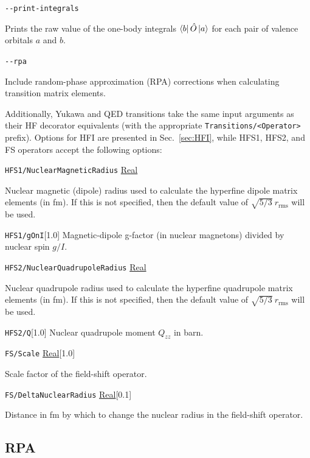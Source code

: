 \documentclass{report}
\begin{document}
\texttt{{-}{-}print-integrals} 
\begin{adjustwidth}{1cm}{}
Prints the raw value of the one-body integrals $\bra{b}\hat{O}\ket{a}$ for each pair of valence 
orbitals $a$ and $b$.
\end{adjustwidth}

\texttt{{-}{-}rpa}
\begin{adjustwidth}{1cm}{}
Include random-phase approximation (RPA) corrections when calculating transition matrix elements. 
\end{adjustwidth}

Additionally, Yukawa and QED transitions take the same input arguments as their HF decorator equivalents (with the appropriate \hbox{\texttt{Transitions/\textless{Operator}\textgreater}} prefix). Options for HFI are presented in Sec.~\ref{sec:HFI}, while HFS1, HFS2, and FS operators accept the following options:

\texttt{HFS1/NuclearMagneticRadius} \uline{Real}
\begin{adjustwidth}{1cm}{}
Nuclear magnetic (dipole) radius used to calculate the hyperfine dipole matrix elements (in fm). If this is not
specified, then the default value of $\sqrt{5/3} ~ r_{\textrm{rms}}$ will be used.
\end{adjustwidth}

\texttt{HFS1/gOnI}[1.0]
Magnetic-dipole g-factor (in nuclear magnetons) divided by nuclear spin $g/I$.

\texttt{HFS2/NuclearQuadrupoleRadius} \uline{Real}
\begin{adjustwidth}{1cm}{}
Nuclear quadrupole radius used to calculate the hyperfine quadrupole matrix elements (in fm). If this is not
specified, then the default value of $\sqrt{5/3} ~ r_{\textrm{rms}}$ will be used.
\end{adjustwidth}

\texttt{HFS2/Q}[1.0]
Nuclear quadrupole moment $Q_{zz}$ in barn.

\texttt{FS/Scale} \uline{Real}[1.0]
\begin{adjustwidth}{1cm}{}
Scale factor of the field-shift operator.
\end{adjustwidth}

\texttt{FS/DeltaNuclearRadius} \uline{Real}[0.1]
\begin{adjustwidth}{1cm}{}
Distance in fm by which to change the nuclear radius in the field-shift operator. 
\end{adjustwidth}

\subsection{RPA}
\end{document}
